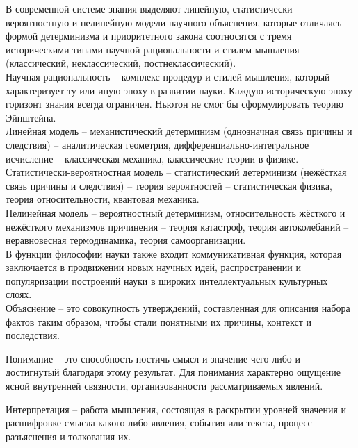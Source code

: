 \documentclass[exam_answers.tex]{subfiles}
\begin{document}
\renewcommand{\baselinestretch}{\blch}

В современной системе знания выделяют линейную, статистически-вероятностную и нелинейную модели научного объяснения, которые отличаясь формой детерминизма и приоритетного закона соотносятся с тремя историческими типами научной рациональности и стилем мышления (классический, неклассический, постнеклассический).
\\

Научная рациональность – комплекс процедур и стилей мышления, который характеризует ту или иную эпоху в развитии науки. Каждую историческую эпоху горизонт знания всегда ограничен. Ньютон не смог бы сформулировать теорию Эйнштейна.
\\

Линейная модель – механистический детерминизм (однозначная связь причины и следствия) – аналитическая геометрия, дифференциально-интегральное исчисление – классическая механика, классические теории в физике.
\\

Статистически-вероятностная модель – статистический детерминизм (нежёсткая связь причины и следствия) – теория вероятностей – статистическая физика, теория относительности, квантовая механика.
\\

Нелинейная модель – вероятностный детерминизм, относительность жёсткого и нежёсткого механизмов причинения – теория катастроф, теория автоколебаний – неравновесная термодинамика, теория самоорганизации.
\\

В функции философии науки также входит коммуникативная функция, которая заключается в продвижении новых научных идей, распространении и популяризации построений науки в широких интеллектуальных культурных слоях.
\\

Объяснение – это совокупность утверждений, составленная для описания набора фактов таким образом, чтобы стали понятными их причины, контекст и последствия.

Понимание – это способность постичь смысл и значение чего-либо и достигнутый благодаря этому результат.
Для понимания характерно ощущение ясной внутренней связности, организованности рассматриваемых явлений.

Интерпретация – работа мышления, состоящая в раскрытии уровней значения и расшифровке смысла какого-либо явления, события или текста, процесс разъяснения и толкования их.
\end{document}
